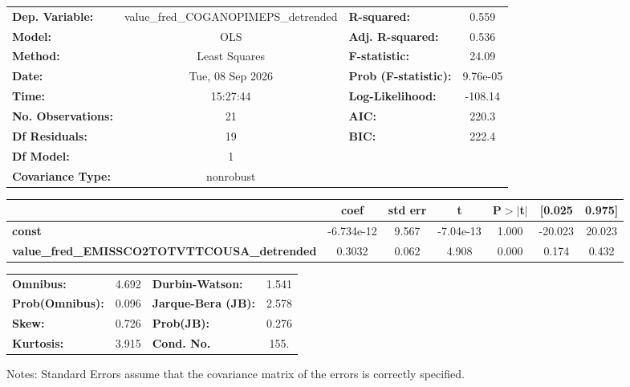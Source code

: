 \begin{center}
\begin{tabular}{lclc}
\toprule
\textbf{Dep. Variable:}                              & value\_fred\_COGANOPIMEPS\_detrended & \textbf{  R-squared:         } &     0.559   \\
\textbf{Model:}                                      &                 OLS                  & \textbf{  Adj. R-squared:    } &     0.536   \\
\textbf{Method:}                                     &            Least Squares             & \textbf{  F-statistic:       } &     24.09   \\
\textbf{Date:}                                       &           Tue, 08 Sep 2026           & \textbf{  Prob (F-statistic):} &  9.76e-05   \\
\textbf{Time:}                                       &               15:27:44               & \textbf{  Log-Likelihood:    } &   -108.14   \\
\textbf{No. Observations:}                           &                    21                & \textbf{  AIC:               } &     220.3   \\
\textbf{Df Residuals:}                               &                    19                & \textbf{  BIC:               } &     222.4   \\
\textbf{Df Model:}                                   &                     1                & \textbf{                     } &             \\
\textbf{Covariance Type:}                            &              nonrobust               & \textbf{                     } &             \\
\bottomrule
\end{tabular}
\begin{tabular}{lcccccc}
                                                     & \textbf{coef} & \textbf{std err} & \textbf{t} & \textbf{P$> |$t$|$} & \textbf{[0.025} & \textbf{0.975]}  \\
\midrule
\textbf{const}                                       &   -6.734e-12  &        9.567     & -7.04e-13  &         1.000        &      -20.023    &       20.023     \\
\textbf{value\_fred\_EMISSCO2TOTVTTCOUSA\_detrended} &       0.3032  &        0.062     &     4.908  &         0.000        &        0.174    &        0.432     \\
\bottomrule
\end{tabular}
\begin{tabular}{lclc}
\textbf{Omnibus:}       &  4.692 & \textbf{  Durbin-Watson:     } &    1.541  \\
\textbf{Prob(Omnibus):} &  0.096 & \textbf{  Jarque-Bera (JB):  } &    2.578  \\
\textbf{Skew:}          &  0.726 & \textbf{  Prob(JB):          } &    0.276  \\
\textbf{Kurtosis:}      &  3.915 & \textbf{  Cond. No.          } &     155.  \\
\bottomrule
\end{tabular}
\end{center}

Notes: \newline
 [1] Standard Errors assume that the covariance matrix of the errors is correctly specified.